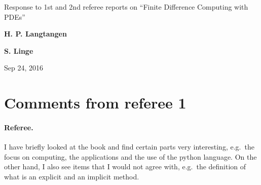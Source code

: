 \documentclass[%
oneside,                 %
final,                   %
10pt]{article}
\begin{document}

\newcommand{\exercisesection}[1]{\subsection*{#1}}






\thispagestyle{empty}

\begin{center}
{\LARGE\bf
\begin{spacing}{1.25}
Response to 1st and 2nd referee reports on ``Finite Difference Computing with PDEs''
\end{spacing}
}
\end{center}


\begin{center}
{\bf H. P. Langtangen${}^{}$} \\ [0mm]
\end{center}


\begin{center}
{\bf S. Linge${}^{}$} \\ [0mm]
\end{center}

\begin{center}
\end{center}
    

\begin{center}
Sep 24, 2016
\end{center}

\vspace{1cm}


\section{Comments from referee 1}

\paragraph{Referee.}
I have briefly looked at the book and find certain parts very interesting, e.g.~the focus on computing, the applications and the use of the python language. On the other hand, I also see items that I would not agree with, e.g.~the definition of what is an explicit and an implicit method.
\end{document}

